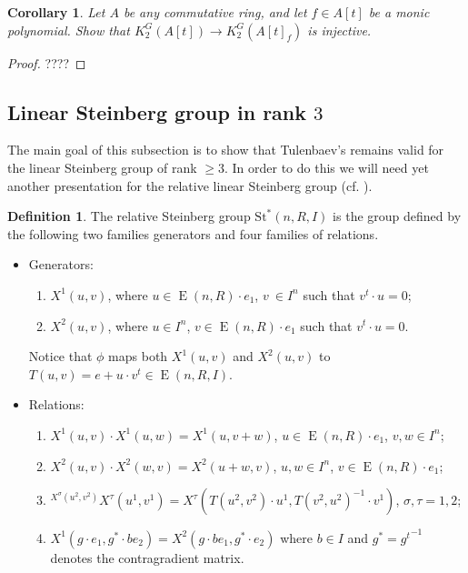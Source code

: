 \documentclass[oneside,12pt]{amsart}
\numberwithin{equation}{section}
\numberwithin{lem}{section}
\newtheorem{cor}[lem]{Corollary}
\theoremstyle{definition}
\newtheorem{dfn}[lem]{Definition}
\theoremstyle{remark}
\DeclareMathOperator{\EE}{E}
\newcommand{\Stb}{\mathrm{St}}
\begin{document}
\begin{cor}
 Let $A$ be any commutative ring, and let $f\in A[t]$ be a monic polynomial. Show that
$K_2^G(A[t])\to K_2^G(A[t]_f)$ is injective.
\end{cor}
\begin{proof}
????
\end{proof}

\begin{appendices}

\section{Linear Steinberg group in rank $3$}

The main goal of this subsection is to show that Tulenbaev's \cite[Lemma~2.3]{Tu} remains valid for the linear Steinberg group of rank $\geq 3$.
In order to do this we will need yet another presentation for the relative linear Steinberg group (cf. \cite[Definitions~3.3 and 3.7]{S15}).
\begin{dfn}
 The relative Steinberg group $\Stb^*(n,R, I)$ is the group defined by the following two
 families generators and four families of relations.
 \begin{itemize}
  \item Generators:
  \begin{enumerate}
  \item $X^1(u, v)$, where $u \in \EE(n,R) \cdot e_1$, $v\ \in I^n$ such that $v^t \cdot u = 0$;
  \item $X^2(u, v)$, where $u \in I^n$, $v \in \EE(n,R) \cdot e_1$ such that $v^t \cdot u = 0$.
 \end{enumerate}
  Notice that $\phi$ maps both $X^1(u, v)$ and $X^2(u, v)$ to $T(u, v) = e + u \cdot v^t \in \EE(n, R, I)$.
  \item Relations:
  \begin{enumerate}
  \item $X^1(u, v) \cdot X^1(u, w) = X^1(u, v+w)$, $u \in \EE(n,R) \cdot e_1$, $v, w \in I^n$;
  \item $X^2(u, v) \cdot X^2(w, v) = X^2(u+w, v)$, $u, w \in I^n$, $v \in \EE(n,R) \cdot e_1$;
  \item ${}^{X^\sigma(u^2, v^2)} \! X^\tau(u^1, v^1) = X^\tau(T(u^2, v^2) \cdot u^1, T(v^2, u^2)^{-1} \cdot v^1)$, $\sigma, \tau = 1,2$;
  \item $X^1(g \cdot e_1, g^* \cdot be_2) = X^2(g \cdot be_1, g^* \cdot e_2)$ where $b\in I$ and $g^* = {g^t}^{-1}$ denotes the contragradient matrix.
 \end{enumerate}
 \end{itemize}
\end{dfn}


\end{appendices}
\end{document}
